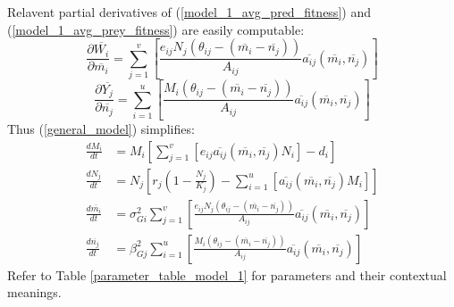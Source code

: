 \documentclass{amsart}
\theoremstyle{definition}
\theoremstyle{remark}
\numberwithin{equation}{section}
\begin{document}
Relavent partial derivatives of (\ref{model_1_avg_pred_fitness}) and (\ref{model_1_avg_prey_fitness}) are easily computable:
\begin{equation}
	\label{model_1_pred_fitness_partial}
	\frac{\partial \overline{W_i}}{\partial \overline{m_i}} = \sum\limits_{j = 1}^{v}\left[\frac{e_{ij}N_j(\theta_{ij} - (\overline{m_i} - \overline{n_j}))}{A_{ij}}\overline{a_{ij}}(\overline{m_i}, \overline{n_j})\right]
\end{equation}
\begin{equation}
	\label{model_1_prey_fitness_partial}
	\frac{\partial \overline{Y_j}}{\partial \overline{n_j}} = \sum\limits_{i = 1}^{u}\left[\frac{M_i(\theta_{ij} - (\overline{m_i} - \overline{n_j}))}{A_{ij}}\overline{a_{ij}}(\overline{m_i}, \overline{n_j})\right]
\end{equation}
Thus (\ref{general_model}) simplifies:
\begin{subequations}
	\label{model1}
	\begin{align}
		\label{eq:model1_a}
		\frac{dM_i}{dt} &= M_i\left[\sum\limits_{j = 1}^{v}\left[e_{ij}\overline{a_{ij}}(\overline{m_i}, \overline{n_j})N_i\right] - d_i\right] \\[5px]
		\label{eq:model1_b}
		\frac{dN_j}{dt} &= N_j\left[r_j\left(1 - \frac{N_j}{K_j}\right) - \sum\limits_{i = 1}^{u}\left[\overline{a_{ij}}(\overline{m_i}, \overline{n_j})M_i\right]\right] \\[5px]
		\label{eq:model1_c}
		\frac{d\overline{m_i}}{dt} &= \sigma_{Gi}^2\sum\limits_{j = 1}^{v}\left[\frac{e_{ij}N_j(\theta_{ij} - (\overline{m_i} - \overline{n_j}))}{A_{ij}}\overline{a_{ij}}(\overline{m_i}, \overline{n_j})\right] \\[5px]
		\label{eq:model1_d}
		\frac{d\overline{n_j}}{dt} &= \beta_{Gj}^2\sum\limits_{i = 1}^{u}\left[\frac{M_i(\theta_{ij} - (\overline{m_i} - \overline{n_j}))}{A_{ij}}\overline{a_{ij}}(\overline{m_i}, \overline{n_j})\right]
	\end{align}
\end{subequations}
Refer to Table \ref{parameter_table_model_1} for parameters and their contextual meanings.
\end{document}
